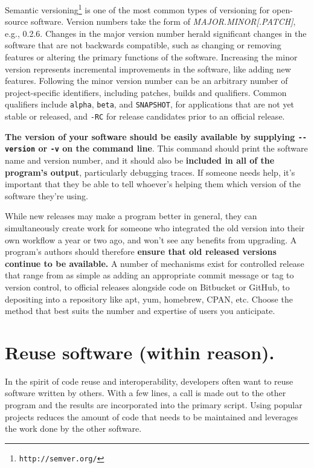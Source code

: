 \documentclass[10pt,letterpaper]{article}
\newcommand{\withurl}[2]{{#1}\footnote{\texttt{#2}}}
\begin{document}
\withurl{Semantic versioning}{http://semver.org/} is one of the most common
types of versioning for open-source software. Version numbers take the
form of \emph{MAJOR.MINOR{[}.PATCH{]}}, e.g., 0.2.6.
Changes in the major
version number herald significant changes in the software that are not
backwards compatible, such as changing or removing features or altering
the primary functions of the software. Increasing the minor version
represents incremental improvements in the software, like adding new
features. Following the minor version number can be an arbitrary number
of project-specific identifiers, including patches, builds and qualifiers.
Common qualifiers include \texttt{alpha}, \texttt{beta}, and \texttt{SNAPSHOT},
for applications that are
not yet stable or released, and \texttt{-RC} for release candidates prior
to an official release.

\textbf{The version of your software should be easily available by 
supplying \texttt{-\/-version} or \texttt{-v} on the command line}. This command should print
the software name and version number, and it should
also be \textbf{included in all of the program's output}, particularly debugging
traces.  If someone needs help, it's important that they be able to tell
whoever's helping them which version of the software they're using.

While new releases may make a program better in general,
they can simultaneously create work for someone
who integrated the old version into their own workflow a year or two ago,
and won't see any benefits from upgrading.
A program's authors should therefore \textbf{ensure that old released versions
continue to be available.}
A number of mechanisms exist for
controlled release that range from as simple as adding an appropriate
commit message or tag to version control, to official releases alongside
code on Bitbucket or GitHub, to depositing into a
repository like apt, yum, homebrew, CPAN, etc. Choose the method that
best suits the number and expertise of users you anticipate.

\section{Reuse software (within reason).}

In the spirit of code reuse and interoperability, developers often want
to reuse software written by others. 
With a few lines, a call
is made out to the other program and the results are incorporated into the
primary script. Using popular projects reduces the amount of code that
needs to be maintained and leverages the work done by the other software.
\end{document}
